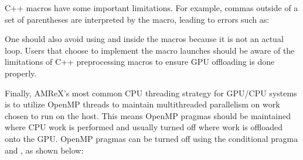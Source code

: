 \documentclass[letterpaper,10pt,english]{sphinxmanual}
\begin{document}
\sphinxAtStartPar
C++ macros have some important limitations. For example, commas outside
of a set of parentheses are interpreted by the macro, leading to errors such
as:

\begin{sphinxVerbatim}[commandchars=\\\{\}]
  
                
                                               
            
     
\end{sphinxVerbatim}

\sphinxAtStartPar
One should also avoid using  and  inside the macros
because it is not an actual  loop.
Users that choose to implement the macro launches should be aware of the limitations
of C++ preprocessing macros to ensure GPU offloading is done properly.

\sphinxAtStartPar
Finally, AMReX’s most common CPU threading strategy for GPU/CPU systems is to utilize
OpenMP threads to maintain multi\sphinxhyphen{}threaded parallelism on work chosen to run on the host.
This means OpenMP pragmas should be maintained where CPU work is performed and usually
turned off where work is offloaded onto the GPU.  OpenMP pragmas can be turned
off using the conditional pragma and , as shown below:

\begin{sphinxVerbatim}[commandchars=\\\{\}]
\end{sphinxVerbatim}
\end{document}
